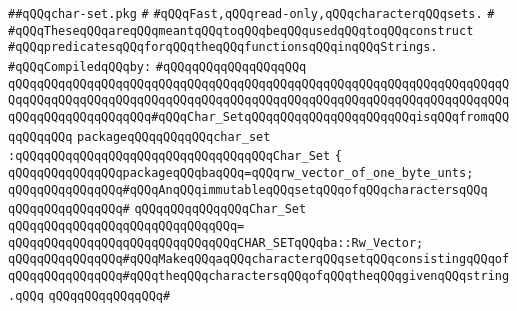 \label{src/lib/std/src/char-set.pkg}
\verb|##qQQqchar-set.pkg|\newline
\verb|#|\newline
\verb|#qQQqFast,qQQqread-only,qQQqcharacterqQQqsets.|\newline
\verb|#|\newline
\verb|#qQQqTheseqQQqareqQQqmeantqQQqtoqQQqbeqQQqusedqQQqtoqQQqconstruct|\newline
\verb|#qQQqpredicatesqQQqforqQQqtheqQQqfunctionsqQQqinqQQqStrings.|\newline
\newline
\verb|#qQQqCompiledqQQqby:|\newline
\verb|#qQQqqQQqqQQqqQQqqQQq|\newline
\newline
\newline
\newline
\verb|qQQqqQQqqQQqqQQqqQQqqQQqqQQqqQQqqQQqqQQqqQQqqQQqqQQqqQQqqQQqqQQqqQQqqQQqqQQqqQQqqQQqqQQqqQQqqQQqqQQqqQQqqQQqqQQqqQQqqQQqqQQqqQQqqQQqqQQqqQQqqQQqqQQqqQQqqQQqqQQq#qQQqChar_SetqQQqqQQqqQQqqQQqqQQqqQQqisqQQqfromqQQqqQQqqQQq|\newline
\newline
\verb|packageqQQqqQQqqQQqchar_set|\newline
\verb|:qQQqqQQqqQQqqQQqqQQqqQQqqQQqqQQqqQQqChar_Set|\newline
\verb|{|\newline
\verb|qQQqqQQqqQQqqQQqpackageqQQqbaqQQq=qQQqrw_vector_of_one_byte_unts;|\newline
\newline
\verb|qQQqqQQqqQQqqQQq#qQQqAnqQQqimmutableqQQqsetqQQqofqQQqcharactersqQQq|\newline
\verb|qQQqqQQqqQQqqQQq#|\newline
\verb|qQQqqQQqqQQqqQQqChar_Set|\newline
\verb|qQQqqQQqqQQqqQQqqQQqqQQqqQQqqQQq=|\newline
\verb|qQQqqQQqqQQqqQQqqQQqqQQqqQQqqQQqCHAR_SETqQQqba::Rw_Vector;|\newline
\newline
\verb|qQQqqQQqqQQqqQQq#qQQqMakeqQQqaqQQqcharacterqQQqsetqQQqconsistingqQQqof|\newline
\verb|qQQqqQQqqQQqqQQq#qQQqtheqQQqcharactersqQQqofqQQqtheqQQqgivenqQQqstring.qQQq|\newline
\verb|qQQqqQQqqQQqqQQq#|\newline
